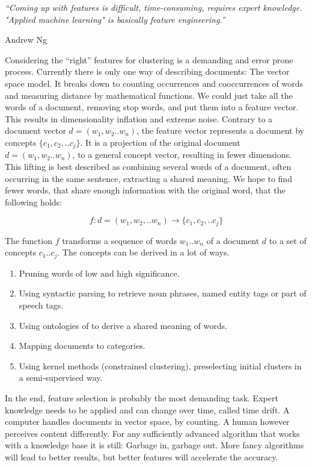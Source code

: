 \epigraph{\emph{
  ``Coming up with features is difficult, time-consuming, requires expert knowledge. "Applied machine learning" is basically feature engineering.''
}}{ Andrew Ng }

Considering the ``right'' features for clustering is a demanding and error prone process. Currently there is only one way of describing documents: The vector space model. It breaks down to counting occurrences and cooccurrences of words and measuring distance by mathematical functions. We could just take all the words of a document, removing stop words, and put them into a feature vector. This results in dimensionality inflation and extreme noise. Contrary to a document vector $d = (w_1,w_2..w_n)$, the feature vector represents a document by concepts $\{c_1,c_2,..c_j\}$. It is a projection of the original document $d = (w_1,w_2..w_n)$, to a general concept vector, resulting in fewer dimensions. This lifting is best described as combining several words of a document, often occurring in the same sentence, extracting a shared meaning. We hope to find fewer words, that share enough information with the original word, that the following holds:
  
  \begin{equation}
    f : d=(w_1,w_2,..w_n) \to \{c_1,c_2,..c_j\}
  \end{equation}

The function $f$ transforms a sequence of words $w_1..w_n$ of a document $d$ to a set of concepts $c_1..c_j$. The concepts can be derived in a lot of ways.

  \begin{enumerate}
    \item Pruning words of low and high significance.
    \item Using syntactic parsing to retrieve noun phrases, named entity tags or part of speech tags.
    \item Using ontologies of \wordnet{} to derive a shared meaning of words.
    \item Mapping documents to \wiki{} categories.
    \item Using kernel methods (constrained clustering), preselecting initial clusters in a semi-supervised way.
  \end{enumerate}

In the end, feature selection is probably the most demanding task. Expert knowledge needs to be applied and can change over time, called time drift. A computer handles documents in vector space, by counting. A human however perceives content differently. For any sufficiently advanced algorithm that works with a knowledge base it is still: Garbage in, garbage out. More fancy algorithms will lead to better results, but better features will accelerate the accuracy.\\

